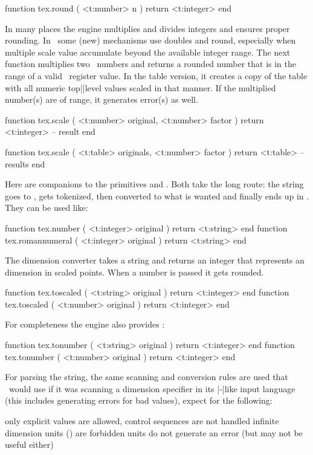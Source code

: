 \starttyping[option=LUA]
function tex.round ( <t:number> n )
    return <t:integer>
end
\stoptyping

In many places the engine multiplies and divides integers and ensures proper
rounding. In \LUAMETATEX\ some (new) mechanisms use doubles and round, especially
when multiple scale value accumulate beyond the available integer range. The next
function multiplies two \LUA\ numbers and returns a rounded number that is in the
range of a valid \TEX\ register value. In the table version, it creates a copy of
the table with all numeric top||level values scaled in that manner. If the
multiplied number(s) are of range, it generates  error(s)
as well.

\starttyping[option=LUA]
function tex.scale ( <t:number> original, <t:number> factor )
    return <t:integer> -- result
end

function tex.scale ( <t:table> originals, <t:number> factor )
    return <t:table> -- results
end
\stoptyping

Here are companions to the primitives \type {\number} and \type {\romannumeral}.
Both take the long route: the string goes to \TEX, gets tokenized, then converted
to what is wanted and finally ends up in \LUA. They can be used like:

\starttyping[option=LUA]
function tex.number       ( <t:integer> original ) return <t:string> end
function tex.romannumeral ( <t:integer> original ) return <t:string> end
\stoptyping

The dimension converter takes a string and returns an integer that represents an
dimension in scaled points. When a number is passed it gets rounded.

\starttyping[option=LUA]
function tex.toscaled ( <t:string> original ) return <t:integer> end
function tex.toscaled ( <t:number> original ) return <t:integer> end
\stoptyping

For completeness the engine also provides :

\starttyping[option=LUA]
function tex.tonumber ( <t:string> original ) return <t:integer> end
function tex.tonumber ( <t:number> original ) return <t:integer> end
\stoptyping

For parsing the string, the same scanning and conversion rules are used that
\LUATEX\ would use if it was scanning a dimension specifier in its \TEX|-|like
input language (this includes generating errors for bad values), expect for the
following:

\startitemize[n,packed]
\startitem
    only explicit values are allowed, control sequences are not handled
\stopitem
\startitem
    infinite dimension units () are forbidden
\stopitem
\startitem
     units do not generate an error (but may not be useful either)
\stopitem
\stopitemize

